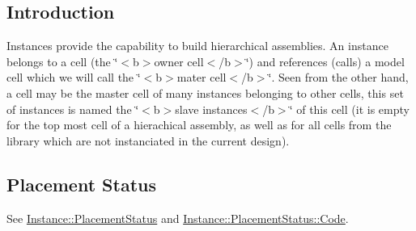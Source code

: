 \hypertarget{classHurricane_1_1Instance_secInstanceIntro}{}\subsection{Introduction}\label{classHurricane_1_1Instance_secInstanceIntro}
Instances provide the capability to build hierarchical assemblies. An instance belongs to a cell (the \char`\"{}$<$b$>$owner 
              cell$<$/b$>$\char`\"{}) and references (calls) a model cell which we will call the \char`\"{}$<$b$>$mater cell$<$/b$>$\char`\"{}. Seen from the other hand, a cell may be the master cell of many instances belonging to other cells, this set of instances is named the \char`\"{}$<$b$>$slave 
              instances$<$/b$>$\char`\"{} of this cell (it is empty for the top most cell of a hierachical assembly, as well as for all cells from the library which are not instanciated in the current design).\hypertarget{classHurricane_1_1Instance_secInstancePlacement}{}\subsection{Placement Status}\label{classHurricane_1_1Instance_secInstancePlacement}
See \hyperlink{classHurricane_1_1Instance_1_1PlacementStatus}{Instance\+::\+Placement\+Status} and \hyperlink{classHurricane_1_1Instance_1_1PlacementStatus_af76cc0838783b3eb3a515eb3c3e0f7bf}{Instance\+::\+Placement\+Status\+::\+Code}.

